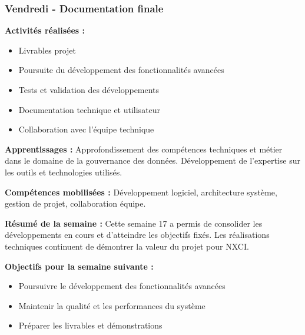 \subsubsection{Vendredi - Documentation finale}

\textbf{Activités réalisées :}
\begin{itemize}
    \item Livrables projet
    \item Poursuite du développement des fonctionnalités avancées
    \item Tests et validation des développements
    \item Documentation technique et utilisateur
    \item Collaboration avec l'équipe technique
\end{itemize}

\textbf{Apprentissages :}
Approfondissement des compétences techniques et métier dans le domaine de la gouvernance des données. Développement de l'expertise sur les outils et technologies utilisés.

\textbf{Compétences mobilisées :}
Développement logiciel, architecture système, gestion de projet, collaboration équipe.

\textbf{Résumé de la semaine :}
Cette semaine 17 a permis de consolider les développements en cours et d'atteindre les objectifs fixés. Les réalisations techniques continuent de démontrer la valeur du projet pour NXCI.

\textbf{Objectifs pour la semaine suivante :}
\begin{itemize}
    \item Poursuivre le développement des fonctionnalités avancées
    \item Maintenir la qualité et les performances du système
    \item Préparer les livrables et démonstrations
\end{itemize}

